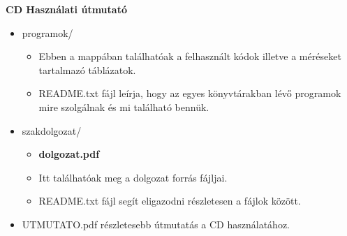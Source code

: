 \pagestyle{empty}

\noindent \textbf{\Large CD Használati útmutató}

\vskip 1cm

\begin{itemize}
	\item programok/
		\begin{itemize}
			\item Ebben a mappában találhatóak a felhasznált kódok illetve a méréseket tartalmazó táblázatok.
			\item README.txt fájl leírja, hogy az egyes könyvtárakban lévő programok mire szolgálnak és mi található bennük.
		\end{itemize}
	\item szakdolgozat/
		\begin{itemize}
			\item \textbf{dolgozat.pdf}
			\item Itt találhatóak meg a dolgozat forrás fájljai.
			\item README.txt fájl segít eligazodni részletesen a fájlok között.
		\end{itemize}
		
	\item UTMUTATO.pdf részletesebb útmutatás a CD használatához.
\end{itemize}


%

